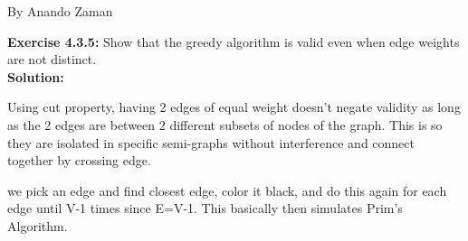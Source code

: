 \documentclass[11pt,fleqn]{article}
\begin{document}
By Anando Zaman

\textbf{Exercise 4.3.5:} Show that the greedy algorithm is valid even when edge weights are not distinct.\\

\textbf{Solution:}\\

\begin{center}
	\item Using cut property, having 2 edges of equal weight doesn't negate validity as long as the 2 edges are between 2 different subsets of nodes of the graph. This is so they are isolated in specific semi-graphs without interference and connect together by crossing edge.
	\item we pick an edge and find closest edge, color it black, and do this again for each edge until V-1 times since E=V-1. This basically then simulates Prim's Algorithm.
\end{center}



	
\end{document}
